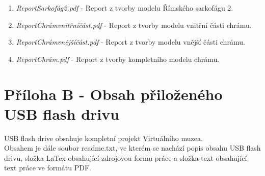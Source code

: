 \documentclass[a4paper, 12pt]{report}
\begin{document}
\begin{thebibliography}{9}
\begin{enumerate}
\item \textit{Report\textunderscore Sarkofág\textunderscore 2.pdf} - Report z tvorby modelu Římského sarkofágu 2.

\item \textit{Report\textunderscore Chrám\textunderscore vnitřní\textunderscore část.pdf} - Report z tvorby modelu vnitřní části chrámu.

\item \textit{Report\textunderscore Chrám\textunderscore vnější\textunderscore část.pdf} - Report z tvorby modelu vnější části chrámu.

\item \textit{Report\textunderscore Chrám.pdf} - Report z tvorby kompletního modelu chrámu.

\end{enumerate}


\section{Příloha B - Obsah přiloženého USB flash drivu}
USB flash drive obsahuje kompletní projekt Virtuálního muzea.\\
Obsahem je dále soubor readme.txt, ve kterém se nachází popis obsahu USB flash drivu, složka LaTex obsahující zdrojovou formu práce a složka text obsahující text práce ve formátu PDF.

\end{thebibliography}
\end{document}

